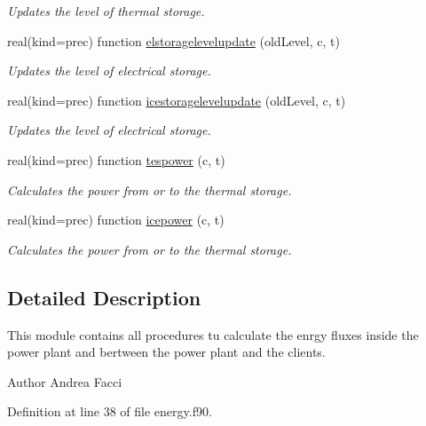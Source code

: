 \begin{DoxyCompactItemize}
\begin{DoxyCompactList}\small\item\em Updates the level of thermal storage. \end{DoxyCompactList}\item 
real(kind=prec) function \hyperlink{classenergy_aeb92167cd5f2d93d35807c14dbac62d3}{elstoragelevelupdate} (old\-Level, c, t)
\begin{DoxyCompactList}\small\item\em Updates the level of electrical storage. \end{DoxyCompactList}\item 
real(kind=prec) function \hyperlink{classenergy_ab4f365b315b8896a61c233c51db31696}{icestoragelevelupdate} (old\-Level, c, t)
\begin{DoxyCompactList}\small\item\em Updates the level of electrical storage. \end{DoxyCompactList}\item 
real(kind=prec) function \hyperlink{classenergy_a3ffd38c81737a9ab7ac3aafc772ee08d}{tespower} (c, t)
\begin{DoxyCompactList}\small\item\em Calculates the power from or to the thermal storage. \end{DoxyCompactList}\item 
real(kind=prec) function \hyperlink{classenergy_a0f259e2e3c19a27638c30ac9300e0e26}{icepower} (c, t)
\begin{DoxyCompactList}\small\item\em Calculates the power from or to the thermal storage. \end{DoxyCompactList}\end{DoxyCompactItemize}


\subsection{Detailed Description}
This module contains all procedures tu calculate the enrgy fluxes inside the power plant and bertween the power plant and the clients. \begin{DoxyAuthor}{Author}
Andrea Facci 
\end{DoxyAuthor}


Definition at line 38 of file energy.\-f90.



